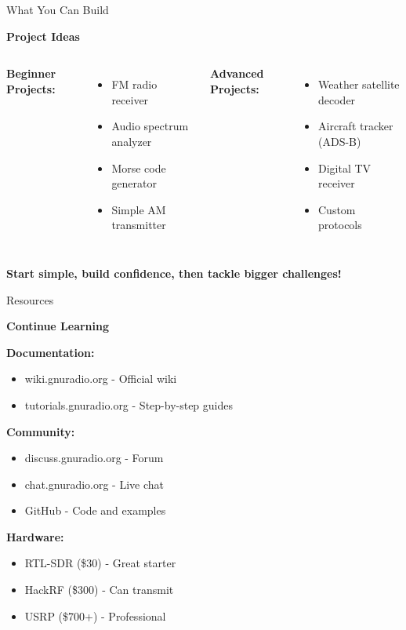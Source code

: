 \documentclass[aspectratio=169,12pt]{beamer}
\begin{document}
\begin{frame}{What You Can Build}
\begin{center}
\Large\textbf{Project Ideas}
\end{center}
\vspace{1em}

\begin{columns}
\textbf{Beginner Projects:}
\begin{itemize}
    \item FM radio receiver
    \item Audio spectrum analyzer
    \item Morse code generator
    \item Simple AM transmitter
\end{itemize}

\textbf{Advanced Projects:}
\begin{itemize}
    \item Weather satellite decoder
    \item Aircraft tracker (ADS-B)
    \item Digital TV receiver
    \item Custom protocols
\end{itemize}
\end{columns}

\vspace{1em}
\begin{center}
\colorbox{radioblue!20}{\parbox{0.8\textwidth}{\centering
\textbf{Start simple, build confidence, then tackle bigger challenges!}}}
\end{center}
\end{frame}

\begin{frame}{Resources}
\begin{center}
\Large\textbf{Continue Learning}
\end{center}
\vspace{1em}

\textbf{Documentation:}
\begin{itemize}
    \item wiki.gnuradio.org - Official wiki
    \item tutorials.gnuradio.org - Step-by-step guides
\end{itemize}

\textbf{Community:}
\begin{itemize}
    \item discuss.gnuradio.org - Forum
    \item chat.gnuradio.org - Live chat
    \item GitHub - Code and examples
\end{itemize}

\textbf{Hardware:}
\begin{itemize}
    \item RTL-SDR (\$30) - Great starter
    \item HackRF (\$300) - Can transmit
    \item USRP (\$700+) - Professional
\end{itemize}
\end{frame}
\end{document}
